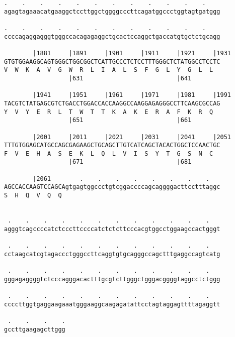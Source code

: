 \documentclass{article}
\begin{document}
\begin{Verbatim}
.    .    .    .    .    .    .    .    .    .    .    .    
agagtagaaacatgaaggctccttggctggggcccttcagatggccctggtagtgatggg
                                                            
.    .    .    .    .    .    .    .    .    .    .    .    
ccccagaggagggtgggccacagagaggctgcactccaggctgaccatgtgctctgcagg
                                                            
        |1881     |1891     |1901     |1911     |1921     |1931
GTGTGGAAGGCAGTGGGCTGGCGGCTCATTGCCCTCTCCTTTGGGCTCTATGGCCTCCTC
V  W  K  A  V  G  W  R  L  I  A  L  S  F  G  L  Y  G  L  L  
                  |631                          |641        
  
        |1941     |1951     |1961     |1971     |1981     |1991
TACGTCTATGAGCGTCTGACCTGGACCACCAAGGCCAAGGAGAGGGCCTTCAAGCGCCAG
Y  V  Y  E  R  L  T  W  T  T  K  A  K  E  R  A  F  K  R  Q  
                  |651                          |661        
  
        |2001     |2011     |2021     |2031     |2041     |2051
TTTGTGGAGCATGCCAGCGAGAAGCTGCAGCTTGTCATCAGCTACACTGGCTCCAACTGC
F  V  E  H  A  S  E  K  L  Q  L  V  I  S  Y  T  G  S  N  C  
                  |671                          |681        
  
        |2061        .    .    .    .    .    .    .    .   
AGCCACCAAGTCCAGCAgtgagtggccctgtcggaccccagcaggggacttcctttaggc
S  H  Q  V  Q  Q                                            
                                                            
  
 .    .    .    .    .    .    .    .    .    .    .    .   
agggtcagccccatctcccttccccatctctcttcccacgtggcctggaagccactgggt
                                                            
 .    .    .    .    .    .    .    .    .    .    .    .   
cctaagcatcgtagaccctgggccttcaggtgtgcagggccagctttgaggccagtcatg
                                                            
 .    .    .    .    .    .    .    .    .    .    .    .   
gggagaggggtctcccagggacactttgcgtcttgggctgggacggggtaggcctctggg
                                                            
 .    .    .    .    .    .    .    .    .    .    .    .   
ccccttggtgaggaagaaatgggaaggcaagagatattcctagtaggagttttagaggtt
                                                            
 .    .    .    .
gccttgaagagcttggg
                 
                 
 

\end{Verbatim}
\end{document}
